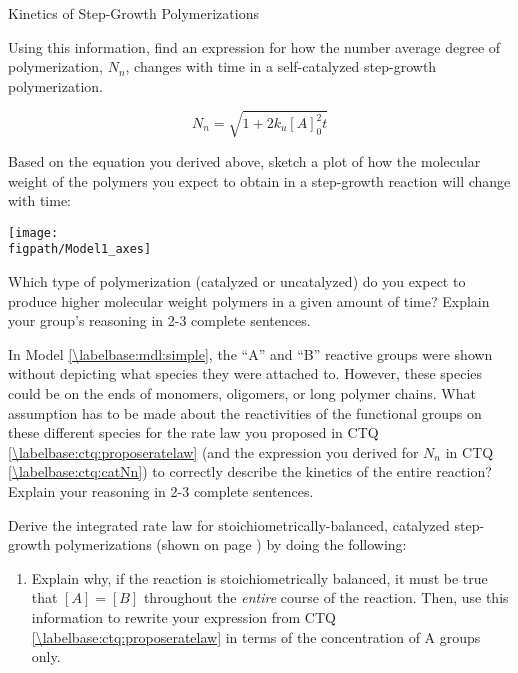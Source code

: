 \begin{activity}{Kinetics of Step-Growth Polymerizations}
\begin{ctqs}

	\question Using this information, find an expression for how the number average degree of polymerization, $N_n$, changes with time in a self-catalyzed step-growth polymerization.
	
		\begin{solution}[1in]
			\begin{equation*}
				N_n = \sqrt{1 + 2k_u [A]_0^2 t}
			\end{equation*}
		\end{solution}
		
	\question Based on the equation you derived above, sketch a plot of how the molecular weight of the polymers you expect to obtain in a step-growth reaction will change with time:
	
		\centerline{\texttt{[image: \\figpath/Model1\_axes]}}
		
	\question Which type of polymerization (catalyzed or uncatalyzed) do you expect to produce higher molecular weight polymers in a given amount of time?  Explain your group's reasoning in 2-3 complete sentences.
	
		\begin{solution}[2in]
		\end{solution}

\end{ctqs}
	

\begin{exercises}

		\exercise In Model \ref{\labelbase:mdl:simple}, the ``A'' and ``B'' reactive groups were shown without depicting what species they were attached to.  However, these species could be on the ends of monomers, oligomers, or long polymer chains. %
		What assumption has to be made about the reactivities of the functional groups on these different species for the rate law you proposed in CTQ \ref{\labelbase:ctq:proposeratelaw} (and the expression you derived for $N_n$ in CTQ \ref{\labelbase:ctq:catNn}) to correctly describe the kinetics of the entire reaction?  Explain your reasoning in 2-3 complete sentences.
			
		\exercise Derive the integrated rate law for stoichiometrically-balanced, catalyzed step-growth polymerizations (shown on page \pageref{\labelbase:infobox:catintegrated}) by doing the following: \label{\labelbase:exc:catinteratelaw}
		
			\begin{enumerate}
				\item Explain why, if the reaction is stoichiometrically balanced, it must be true that $[A]=[B]$ throughout the \emph{entire} course of the reaction.  Then, use this information to rewrite your expression from CTQ \ref{\labelbase:ctq:proposeratelaw} in terms of the concentration of A groups only.
				

\end{enumerate}
\end{exercises}
\end{activity}
